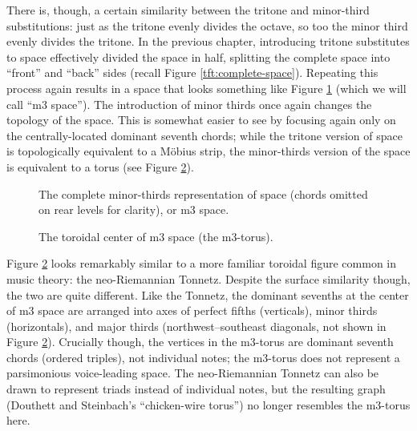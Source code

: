 There is, though, a certain similarity between the tritone and minor-third
substitutions: just as the tritone evenly divides the octave, so too the minor
third evenly divides the tritone. In the previous chapter, introducing tritone
substitutes to \tf space effectively divided the space in half, splitting the
complete space into ``front'' and ``back'' sides (recall Figure
\ref{tft:complete-space}). Repeating this process again results in a space
that looks something like Figure \ref{mts:m3-space} (which we will call ``m3
space''). The introduction of minor thirds once again changes the topology of
the space. This is somewhat easier to see by focusing again only on the
centrally-located dominant seventh chords; while the tritone version of \tf
space is topologically equivalent to a Möbius strip, the minor-thirds version
of the space is equivalent to a torus (see Figure
\ref{mts:m3-torus}).

\begin{figure}[tbp]
  \caption[The complete minor-thirds representation of \tf space (m3 space).]{The
    complete minor-thirds representation of \tf space (\ii chords omitted on
    rear levels for clarity), or m3 space.}
  \label{mts:m3-space}
\end{figure}


\begin{figure}[tbp]
  \caption{The toroidal center of m3 space (the m3-torus).}
  \label{mts:m3-torus}
\end{figure}

Figure \ref{mts:m3-torus} looks remarkably similar to a more familiar toroidal
figure common in music theory: the neo-Riemannian Tonnetz. Despite the surface
similarity though, the two are quite different. Like the Tonnetz, the dominant
sevenths at the center of m3 space are arranged into axes of perfect fifths
(verticals), minor thirds (horizontals), and major thirds (northwest--southeast
diagonals, not shown in Figure \ref{mts:m3-torus}). Crucially though, the
vertices in the m3-torus are dominant seventh chords (ordered triples), not
individual notes; the m3-torus does not represent a parsimonious voice-leading
space. The neo-Riemannian Tonnetz can also be drawn to represent triads instead of
individual notes, but the resulting graph (Douthett and Steinbach's
``chicken-wire torus'') no longer resembles the m3-torus here.

